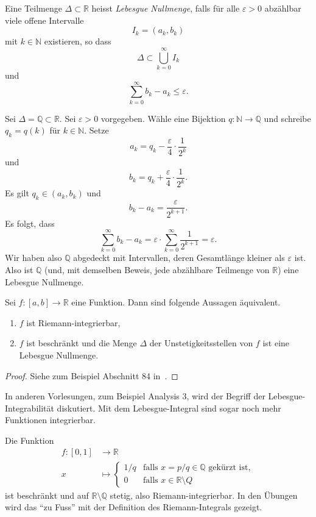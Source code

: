 \documentclass[../main.tex]{subfiles}
\begin{document}
\begin{definition}
  Eine Teilmenge $\Delta \subset \mathbb{R}$
  heisst \emph{Lebesgue Nullmenge},
  falls für alle $\varepsilon > 0$ abzählbar viele
  offene Intervalle
  \[
    I_k = (a_k, b_k)
  \]
  mit $k \in \mathbb{N}$
  existieren, so dass
  \[
    \Delta \subset \bigcup_{k=0}^{\infty} I_k
  \]
  und
  \[
    \sum_{k=0}^{\infty} b_k - a_k \leq \varepsilon.
  \]
\end{definition}

\begin{example}
  Sei $\Delta = \mathbb{Q} \subset \mathbb{R}$.
  Sei $\varepsilon > 0$ vorgegeben.
  Wähle eine Bijektion $q \colon\mathbb{N} \to \mathbb{Q}$
  und schreibe $q_k = q(k)$ für $k \in \mathbb{N}$.
  Setze
  \[
    a_k = q_k - \frac{\varepsilon}{4} \cdot \frac{1}{2^k}
  \]
  und
  \[
    b_k = q_k + \frac{\varepsilon}{4} \cdot \frac{1}{2^k}.
  \]
  Es gilt $q_k \in (a_k, b_k)$ und
  \[
    b_k - a_k = \frac{\varepsilon}{2^{k+1}}.
  \]
  Es folgt, dass
  \[
    \sum_{k=0}^{\infty} b_k - a_k = \varepsilon \cdot
    \sum_{k=0}^{\infty} \frac{1}{2^{k+1}} = \varepsilon.
  \]
  Wir haben also $\mathbb{Q}$ abgedeckt mit Intervallen,
  deren Gesamtlänge kleiner als $\varepsilon$ ist.
  Also ist $\mathbb{Q}$ (und, mit demselben Beweis,
  jede abzählbare Teilmenge von $\mathbb{R}$)
  eine Lebesgue Nullmenge.
\end{example}

\begin{theorem}[Lebesgue 1901]
  Sei $f \colon [a, b] \to \mathbb{R}$ eine Funktion.
  Dann sind folgende Aussagen äquivalent.
  \begin{enumerate}[\normalfont(i)]
    \item $f$ ist  Riemann-integrierbar,
    \item $f$ ist beschränkt und die Menge
      $\Delta$ der Unstetigkeitsstellen von $f$ ist
      eine Lebesgue Nullmenge.
  \end{enumerate}
\end{theorem}

\begin{proof}
  Siehe zum Beispiel Abschnitt 84 in~\cite{heuser}.
\end{proof}

In anderen Vorlesungen, zum Beispiel Analysis 3, wird
der Begriff der Lebesgue-Integrabilität diskutiert.
Mit dem Lebesgue-Integral sind sogar noch mehr Funktionen
integrierbar.

\begin{example}
  Die Funktion
  \begin{align*}
    f \colon [0, 1] & \to \mathbb{R} \\
    x & \mapsto
    \begin{cases}
      1/q & \text{falls $x = p/q \in \mathbb{Q}$ gekürzt ist},\\
      0 & \text{falls $x \in \mathbb{R} \setminus Q$}
    \end{cases}
  \end{align*}
  ist beschränkt
  und auf $\mathbb{R} \setminus \mathbb{Q}$ stetig,
  also Riemann-integrierbar. In den Übungen wird das
  ``zu Fuss'' mit der Definition des Riemann-Integrals
  gezeigt.
\end{example}
\end{document}
